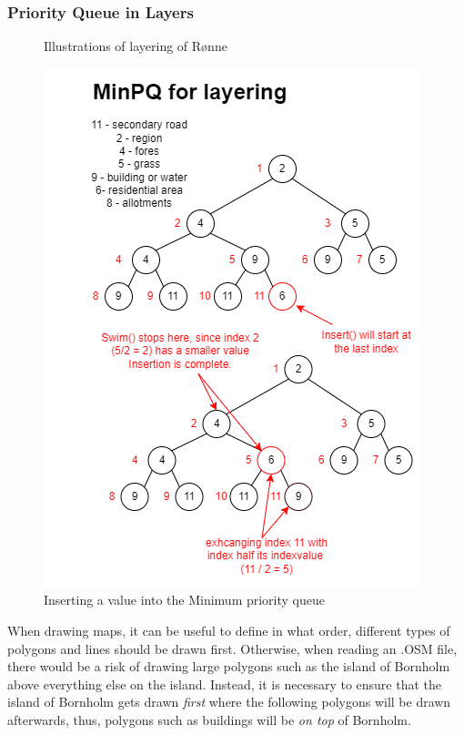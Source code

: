 \subsubsection{Priority Queue in Layers}
\begin{figure}[ht]%
  \centering
  \label{PQ/goodLayers}%
  \caption{Illustrations of layering of Rønne}
\end{figure}
\newpage
\begin{figure}
\includegraphics[width=0.9\linewidth]{docs/material/Insert in minPQ.png} 
\caption{Inserting a value into the Minimum priority queue}\label{PQ/insert}
\label{fig:wrapfig}
\end{figure}
When drawing maps, it can be useful to define in what order, different types of polygons and lines should be drawn first. Otherwise, when reading an .OSM file, there would be a risk of drawing large polygons such as the island of Bornholm above everything else on the island. Instead, it is necessary to ensure that the island of Bornholm gets drawn \textit{first} where the following polygons will be drawn afterwards, thus, polygons such as buildings will be \textit{on top} of Bornholm.\\
